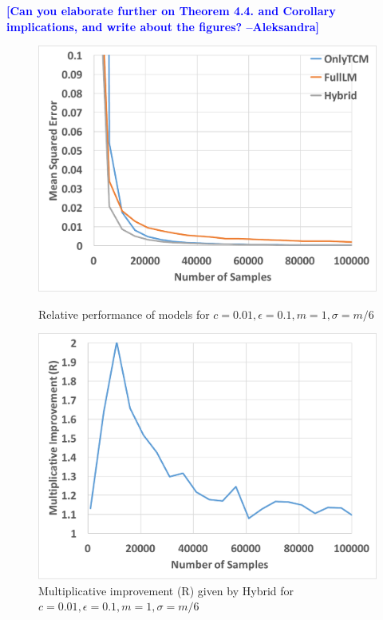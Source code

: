 \documentclass{article}
\newcommand{\ak}[1]{\textcolor{blue}{\bf\small [#1 --Aleksandra]}}
\newcommand\TODO[1]{\textcolor{red}{TODO: {#1}}}
\theoremstyle{plain}
\begin{document}
\ak{Can you elaborate further on Theorem 4.4. and Corollary implications, and write about the figures?}


\begin{figure}[t]
\begin{minipage}[t]{.49\textwidth}
\includegraphics[width=0.99\linewidth]{eps01c01.pdf}
\caption{Relative performance of models for $c=0.01, \epsilon=0.1, m=1, \sigma = m/6$}
\end{minipage}
\begin{minipage}[t]{.49\textwidth}
\includegraphics[width=0.99\linewidth]{imp_eps01c01.pdf}
\caption{Multiplicative improvement (R) given by Hybrid for $c=0.01, \epsilon=0.1, m=1, \sigma = m/6$}
\end{minipage}
\end{figure}
\end{document}
